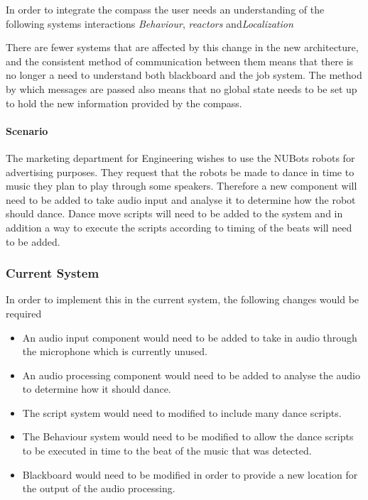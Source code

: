 \documentclass[english,12pt]{scrartcl}
\begin{document}
				In order to integrate the compass the user needs an understanding of the following systems interactions \emph{Behaviour}, \emph{\glspl{reactor}} and\emph{Localization}
				
				There are fewer systems that are affected by this change in the new architecture, and the consistent method of communication between them means that there is no longer a need to understand both blackboard and the job system.
				The method by which messages are passed also means that no global state needs to be set up to hold the new information provided by the compass.

			\paragraph{Scenario} The marketing department for Engineering wishes to use the NUBots robots for advertising purposes. They request that the robots be made to dance in time to music they plan to play through some speakers. Therefore a new component will need to be added to take audio input and analyse it to determine how the robot should dance. Dance move scripts will need to be added to the system and in addition a way to execute the scripts according to timing of the beats will need to be added.

			\subsubsection{Current System} %
				In order to implement this in the current system, the following changes would be required
				\begin{itemize}
					\item An audio input component would need to be added to take in audio through the microphone which is currently unused.
					\item An audio processing component would need to be added to analyse the audio to determine how it should dance.
					\item The script system would need to modified to include many dance scripts.
					\item The Behaviour system would need to be modified to allow the dance scripts to be executed in time to the beat of the music that was detected.
					\item Blackboard would need to be modified in order to provide a new location for the output of the audio processing.
				\end{itemize} %
\end{document}
